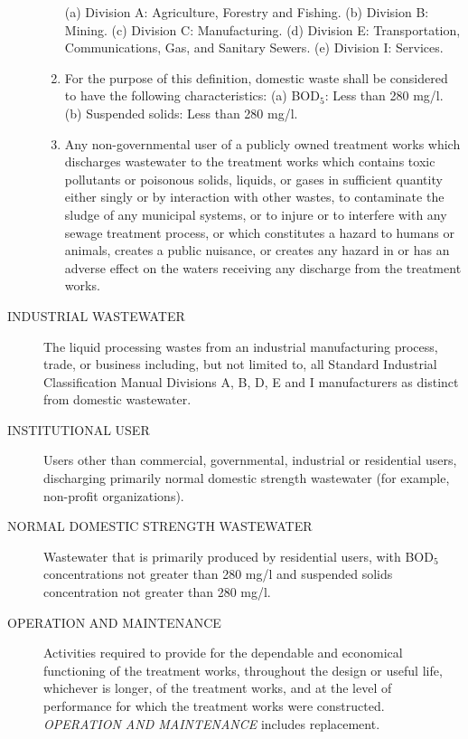 \documentclass[code.tex]{subfiles}
\begin{document}
\begin{description}
\begin{enumerate}
\newline\indent(a) Division A:  Agriculture, Forestry and Fishing.
\newline\indent(b) Division B:  Mining.
\newline\indent(c) Division C:  Manufacturing.
\newline\indent(d) Division E:  Transportation, Communications, Gas, and Sanitary Sewers.
\newline\indent(e) Division I:  Services.
\item For the purpose of this definition, domestic waste shall be considered to have the following characteristics:
\newline\indent(a) BOD$_{5}$: Less than 280 mg/l.
\newline\indent(b) Suspended solids:  Less than 280 mg/l.
\item Any non-governmental user of a publicly owned treatment works which discharges wastewater to the treatment works which contains toxic pollutants or poisonous solids, liquids, or gases in sufficient quantity either singly or by interaction with other wastes, to contaminate the sludge of any municipal systems, or to injure or to interfere with any sewage treatment process, or which constitutes a hazard to humans or animals, creates a public nuisance, or creates any hazard in or has an adverse effect on the waters receiving any discharge from the treatment works.
\end{enumerate}
\item[INDUSTRIAL WASTEWATER] The liquid processing wastes from an industrial manufacturing process, trade, or business including, but not limited to, all Standard Industrial Classification Manual Divisions A, B, D, E and I manufacturers as distinct from domestic wastewater.
\item[INSTITUTIONAL USER] Users other than commercial, governmental, industrial or residential users, discharging primarily normal domestic strength wastewater (for example, non-profit organizations).
\item[NORMAL DOMESTIC STRENGTH WASTEWATER] Wastewater that is primarily produced by residential users, with BOD$_{5}$ concentrations not greater than 280 mg/l and suspended solids concentration not greater than 280 mg/l.
\item[OPERATION AND MAINTENANCE] Activities required to provide for the dependable and economical functioning of the treatment works, throughout the design or useful life, whichever is longer, of the treatment works, and at the level of performance for which the treatment works were constructed.  \emph{OPERATION AND MAINTENANCE} includes replacement.

\end{description}
\end{document}
